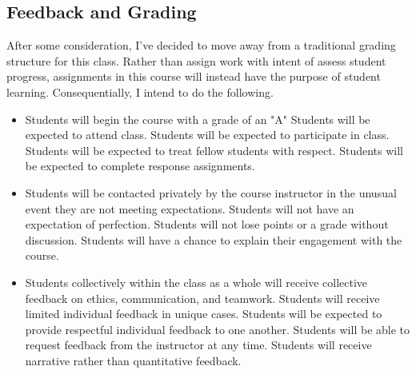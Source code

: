 \documentclass[11pt]{article}
\begin{document}
\subsection*{Feedback and Grading}
After some consideration, I've decided to move away from a traditional grading structure for this class. Rather than assign work with intent of assess student progress, assignments in this course will instead have the purpose of student learning. Consequentially, I intend to do the following.
\begin{itemize}
	\item Students will begin the course with a grade of an "A"
	\subitem Students will be expected to attend class.
	\subitem Students will be expected to participate in class.
	\subitem Students will be expected to treat fellow students with respect.
	\subitem Students will be expected to complete response assignments.
	\item Students will be contacted privately by the course instructor in the unusual event they are not meeting expectations.
	\subitem Students will not have an expectation of perfection.
	\subitem Students will not lose points or a grade without discussion.
	\subitem Students will have a chance to explain their engagement with the course.
	\item Students collectively within the class as a whole will receive collective feedback on ethics, communication, and teamwork.
	\subitem Students will receive limited individual feedback in unique cases.
	\subitem Students will be expected to provide respectful individual feedback to one another.
	\subitem Students will be able to request feedback from the instructor at any time.
	\subitem Students will receive narrative rather than quantitative feedback.
\end{itemize}




\end{document}
